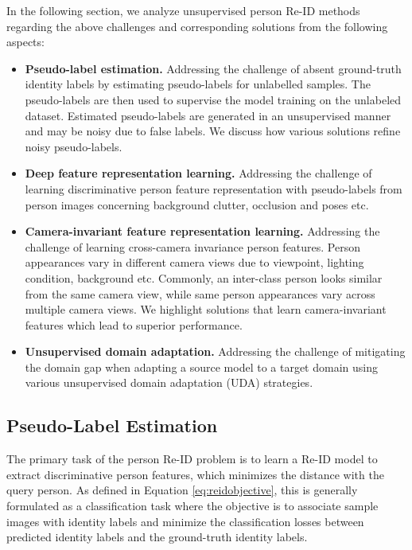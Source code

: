 \documentclass[a4paper,fleqn]{cas-dc}
\begin{document}
In the following section, we analyze unsupervised person Re-ID methods regarding the above challenges and corresponding solutions from the following aspects:
\begin{itemize}
\item {\bf Pseudo-label estimation.} Addressing the challenge of absent ground-truth identity labels by estimating pseudo-labels for unlabelled samples. The pseudo-labels are then used to supervise the model training on the unlabeled dataset. Estimated pseudo-labels are generated in an unsupervised manner and may be noisy due to false labels. We discuss how various solutions refine noisy pseudo-labels.
\item {\bf Deep feature representation learning.} Addressing the challenge of learning discriminative person feature representation with pseudo-labels from person images concerning background clutter, occlusion and poses etc.
\item {\bf Camera-invariant feature representation learning.} Addressing the challenge of learning cross-camera invariance person features. Person appearances vary in different camera views due to viewpoint, lighting condition, background etc. Commonly, an inter-class person looks similar from the same camera view, while same person appearances vary across multiple camera views. We highlight solutions that learn camera-invariant features which lead to superior performance.
\item {\bf Unsupervised domain adaptation.} Addressing the challenge of mitigating the domain gap when adapting a source model to a target domain using various unsupervised domain adaptation (UDA) strategies.
\end{itemize}

\subsection{Pseudo-Label Estimation}

The primary task of the person Re-ID problem is to learn a Re-ID model to extract discriminative person features, which minimizes the distance with the query person. As defined in Equation \ref{eq:reidobjective}, this is generally formulated as a classification task where the objective is to associate sample images with identity labels and minimize the classification losses between predicted identity labels and the ground-truth identity labels. 
 
\end{document}
